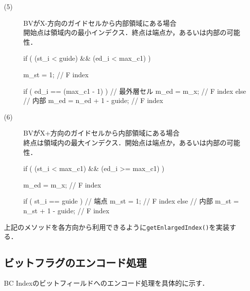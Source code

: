 \begin{description}
\item[(5)] BVがX-方向のガイドセルから内部領域にある場合\\
開始点は領域内の最小インデクス．終点は端点か，あるいは内部の可能性．
{\small
\begin{program}
if ( (st_i < guide) && (ed_i < max_c1) ) {
  m_st = 1; // F index
    
  if ( ed_i == (max_c1 - 1) ) { // 最外層セル
    m_ed = m_x; // F index
  }
  else { // 内部
    m_ed = n_ed + 1 - guide; // F index
  }
}
\end{program}
}

\item[(6)] BVがX+方向のガイドセルから内部領域にある場合\\
終点は領域内の最大インデクス．開始点は端点か，あるいは内部の可能性．
{\small
\begin{program}
if ( (st_i < max_c1) && (ed_i >= max_c1) ) {
  m_ed = m_x; // F index
    
  if ( st_i == guide ) { // 端点
    m_st = 1; // F index
  }
  else { // 内部
    m_st = n_st + 1 - guide; // F index
  }
}
\end{program}
}

\end{description}


上記のメソッドを各方向から利用できるように\verb|getEnlargedIndex()|を実装する．


%
\subsection{ビットフラグのエンコード処理}
BC Indexのビットフィールドへのエンコード処理を具体的に示す．

